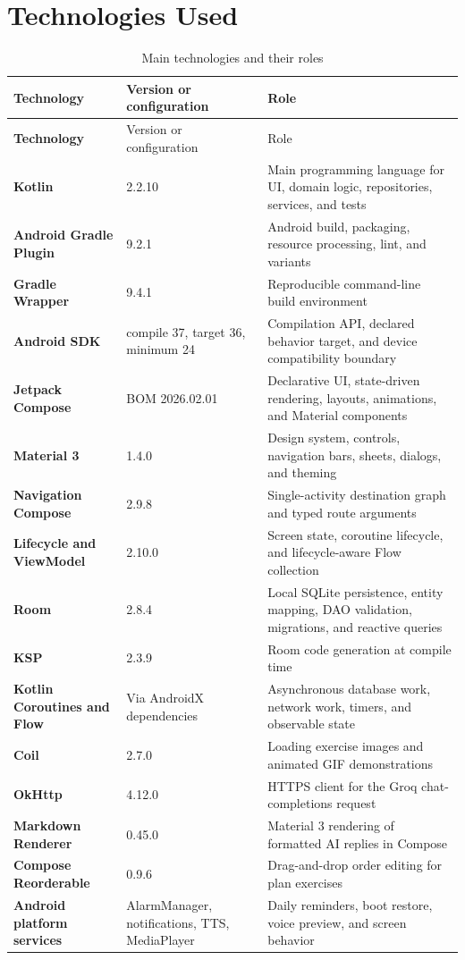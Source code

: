 \section{Technologies Used}

\begin{longtable}{>{\bfseries}p{} p{} p{}}
\caption{Main technologies and their roles}\label{tab:technologies}\\
\toprule
Technology & Version or configuration & Role \\
\midrule
\endfirsthead
\toprule
Technology & Version or configuration & Role \\
\midrule
\endhead
Kotlin & 2.2.10 & Main programming language for UI, domain logic, repositories, services, and tests \\
Android Gradle Plugin & 9.2.1 & Android build, packaging, resource processing, lint, and variants \\
Gradle Wrapper & 9.4.1 & Reproducible command-line build environment \\
Android SDK & compile 37, target 36, minimum 24 & Compilation API, declared behavior target, and device compatibility boundary \\
Jetpack Compose & BOM 2026.02.01 & Declarative UI, state-driven rendering, layouts, animations, and Material components \\
Material 3 & 1.4.0 & Design system, controls, navigation bars, sheets, dialogs, and theming \\
Navigation Compose & 2.9.8 & Single-activity destination graph and typed route arguments \\
Lifecycle and ViewModel & 2.10.0 & Screen state, coroutine lifecycle, and lifecycle-aware Flow collection \\
Room & 2.8.4 & Local SQLite persistence, entity mapping, DAO validation, migrations, and reactive queries \\
KSP & 2.3.9 & Room code generation at compile time \\
Kotlin Coroutines and Flow & Via AndroidX dependencies & Asynchronous database work, network work, timers, and observable state \\
Coil & 2.7.0 & Loading exercise images and animated GIF demonstrations \\
OkHttp & 4.12.0 & HTTPS client for the Groq chat-completions request \\
Markdown Renderer & 0.45.0 & Material 3 rendering of formatted AI replies in Compose \\
Compose Reorderable & 0.9.6 & Drag-and-drop order editing for plan exercises \\
Android platform services & AlarmManager, notifications, TTS, MediaPlayer & Daily reminders, boot restore, voice preview, and screen behavior \\
\bottomrule
\end{longtable}

